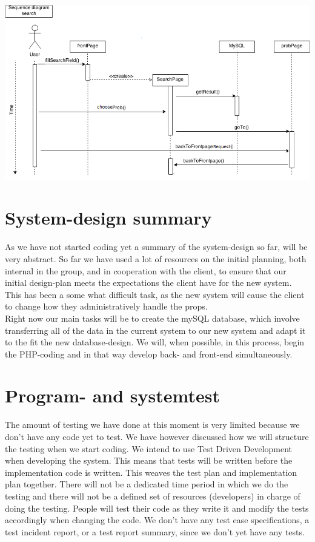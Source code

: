 \documentclass[12pt]{article}
\begin{document}
\includegraphics[scale=0.6]{sequenceDiagram_search.png}\\
\section{System-design summary}
As we have not started coding yet a summary of the system-design so far, will be very abstract. So far we have used a lot of resources on the initial planning, both internal in the group, and in cooperation with the client, to ensure that our initial design-plan meets the expectations the client have for the new system. This has been a some what difficult task, as the new system will cause the client to change how they administratively handle the props. \\ 
Right now our main tasks will be to create the mySQL database, which involve transferring all of the data in the current system to our new system and adapt it to the fit the new database-design. We will, when possible, in this process, begin the PHP-coding and in that way develop back- and front-end simultaneously.
\section{Program- and systemtest}
The amount of testing we have done at this moment is very limited because we don't have any code yet to test. We have however discussed how we will structure the testing when we start coding.
\newline
\newline
We intend to use Test Driven Development when developing the system. This means that tests will be written before the implementation code is written. This weaves the test plan and implementation plan together. There will not be a dedicated time period in which we do the testing and there will not be a defined set of resources (developers) in charge of doing the testing. People will test their code as they write it and modify the tests accordingly when changing the code.
\newline
\newline
We don't have any test case specifications, a test incident report, or a test report summary, since we don't yet have any tests.
\end{document}
